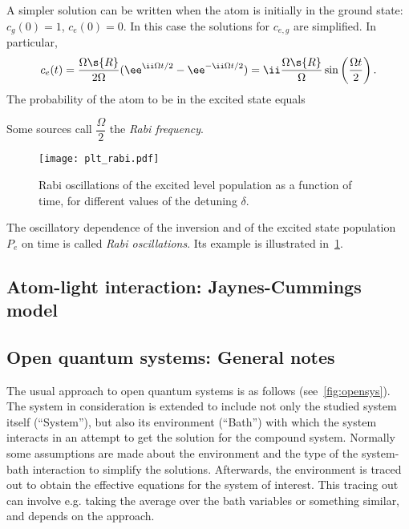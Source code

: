 \documentclass[fontsize=9pt,twoside=semi,bookmarkpackage=false]{scrartcl}
\newcommand*{\mybx}[1]{\colorbox{mygr!15}{\hspace{1em}#1\hspace{1em}}}
\begin{document}
A simpler solution can be written when the atom is initially in the ground state: $c_g (0) = 1$, $c_e (0) = 0$.
In this case the solutions for $c_{e,g }$ are simplified.
In particular,
\begin{equation}
  c_e (t)
  = \frac{ \Omega\s{R} }{ 2 \Omega } ( \ee^{ \ii \Omega t / 2 } - \ee^{- \ii \Omega t /2 } )
  = \ii \frac{ \Omega\s{R} }{  \Omega } \sin \left( \frac{ \Omega t }{ 2 } \right).
\end{equation}
The probability of the atom to be in the excited state equals
Some sources call $\dfrac \Omega  2 $ the \emph{Rabi frequency}.

\begin{figure}[htb]
  \centering
  \texttt{[image: plt\_rabi.pdf]}
  \caption{Rabi oscillations of the excited level population as a function of time, for different values of the detuning $\delta$.}
  \label{fig:plt_rabi-pdf}
\end{figure}
The oscillatory dependence of the inversion and of the excited state population $P_e$ on time is called \emph{Rabi oscillations}.
Its example is illustrated in~\cref{fig:plt_rabi-pdf}.



\subsection{Atom-light interaction: Jaynes-Cummings model} %
\label{sec:atom_light_interaction_jaynes_cummings_model}


\subsection{Open quantum systems: General notes} %
\label{sec:open_quantum_systems}

The usual approach to open quantum systems is as follows (see~\cref{fig:opensys}).
The system in consideration is extended to include not only the studied system itself (``System''), but also its environment (``Bath'') with which the system interacts in an attempt to get the solution for the compound system.
Normally some assumptions are made about the environment and the type of the system-bath interaction to simplify the solutions.
Afterwards, the environment is traced out to obtain the effective equations for the system of interest.
This tracing out can involve e.g. taking the average over the bath variables or something similar, and depends on the approach.
\end{document}
